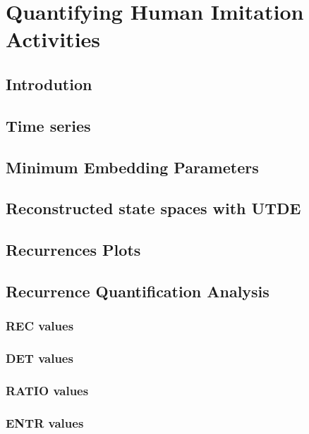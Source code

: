 
\chapter{Quantifying Human Imitation Activities} \label{chapter6}

%
%




\section{Introdution}

\section{Time series}

\section{Minimum Embedding Parameters}

\section{Reconstructed state spaces with UTDE}

\section{Recurrences Plots}

\section{Recurrence Quantification Analysis}


\subsection{REC values}

\subsection{DET values}

\subsection{RATIO values}

\subsection{ENTR values}
